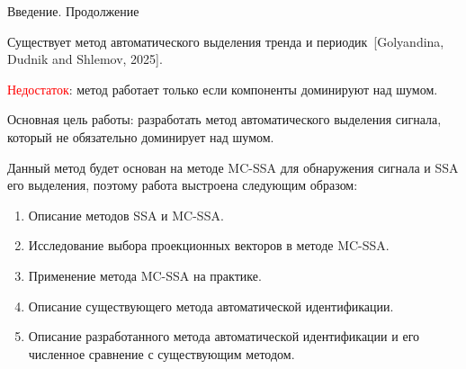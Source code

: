 \documentclass[pdf,notheorems,10pt,intlimits,unicode]{beamer}
\newcommand{\bluetext}[1]{{\usebeamercolor[fg]{bluetext_color}#1}}
\begin{document}
\begin{frame}{Введение. Продолжение}

    Существует метод автоматического выделения тренда и периодик~[Golyandina, Dudnik and Shlemov, 2025].\smallskip

    \textcolor{red}{Недостаток}: метод работает только если компоненты доминируют над шумом.\smallskip

    \bluetext{Основная цель работы}: разработать метод автоматического выделения сигнала, который не обязательно доминирует над шумом.\smallskip

    Данный метод будет основан на методе MC-SSA для обнаружения сигнала и SSA его выделения, поэтому работа выстроена следующим образом:
    \begin{enumerate}
        \item Описание методов SSA и MC-SSA.
        \item Исследование выбора проекционных векторов в методе MC-SSA.
        \item Применение метода MC-SSA на практике.
        \item Описание существующего метода автоматической идентификации.
        \item Описание разработанного метода автоматической идентификации и его численное сравнение с существующим методом.
    \end{enumerate}

\end{frame}

\end{document}
